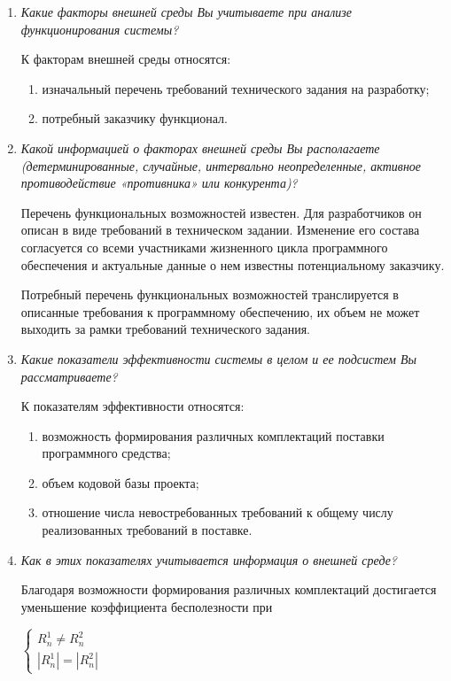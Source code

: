 \documentclass{article}
\begin{document}
\begin{enumerate}
        \item \textit{Какие факторы внешней среды Вы учитываете при анализе функционирования системы?}

        К факторам внешней среды относятся:
        \begin{enumerate}
            \item изначальный перечень требований технического задания на разработку;
            \item потребный заказчику функционал.
        \end{enumerate}

        \item \textit{Какой информацией о факторах внешней среды Вы располагаете (детерминированные, случайные, интервально неопределенные, активное противодействие «противника» или конкурента)?}

        Перечень функциональных возможностей известен. Для разработчиков он описан в виде требований в техническом задании. Изменение его состава согласуется со всеми участниками жизненного цикла программного обеспечения и актуальные данные о нем известны потенциальному заказчику.

        Потребный перечень функциональных возможностей транслируется в описанные требования к программному обеспечению, их объем не может выходить за рамки требований технического задания.

        \item \textit{Какие показатели эффективности системы в целом и ее подсистем Вы рассматриваете?}

        К показателям эффективности относятся:
        \begin{enumerate}
            \item возможность формирования различных комплектаций поставки программного средства;
            \item объем кодовой базы проекта;
            \item отношение числа невостребованных требований к общему числу реализованных требований в поставке.
        \end{enumerate}

        \item \textit{Как в этих показателях учитывается информация о внешней среде?}

        Благодаря возможности формирования различных комплектаций достигается уменьшение коэффициента бесполезности при 

        \begin{center}
        $
            \begin{cases}
                R^1_{n} \not = R^2_{n}\\
                |R^1_{n}| = |R^2_{n}|
            \end{cases}
        $
        \end{center}


\end{enumerate}
\end{document}
